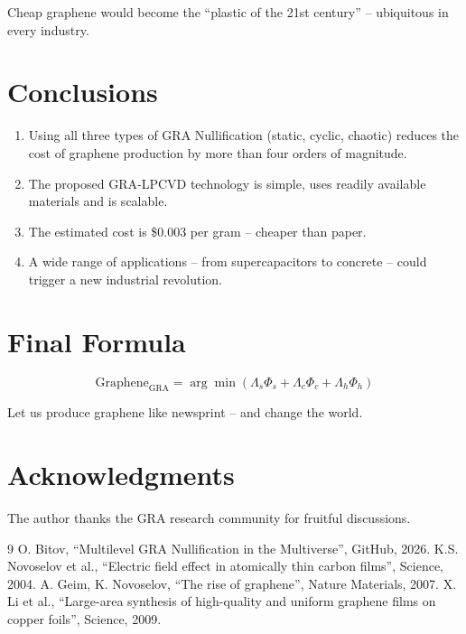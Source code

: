 \documentclass[12pt,a4paper]{article}
\begin{document}
Cheap graphene would become the “plastic of the 21st century” – ubiquitous in every industry.

\section{Conclusions}

\begin{enumerate}
    \item Using all three types of GRA Nullification (static, cyclic, chaotic) reduces the cost of graphene production by more than four orders of magnitude.
    \item The proposed GRA‑LPCVD technology is simple, uses readily available materials and is scalable.
    \item The estimated cost is \$0.003 per gram – cheaper than paper.
    \item A wide range of applications – from supercapacitors to concrete – could trigger a new industrial revolution.
\end{enumerate}

\section*{Final Formula}

\[
\boxed{\text{Graphene}_{\text{GRA}} = \arg\min \left( \Lambda_s \Phi_s + \Lambda_c \Phi_c + \Lambda_h \Phi_h \right)}
\]

Let us produce graphene like newsprint – and change the world.

\section*{Acknowledgments}

The author thanks the GRA research community for fruitful discussions.

\begin{thebibliography}{9}
 O. Bitov, “Multilevel GRA Nullification in the Multiverse”, GitHub, 2026.
 K.S. Novoselov et al., “Electric field effect in atomically thin carbon films”, Science, 2004.
 A. Geim, K. Novoselov, “The rise of graphene”, Nature Materials, 2007.
 X. Li et al., “Large-area synthesis of high-quality and uniform graphene films on copper foils”, Science, 2009.
\end{thebibliography}
\end{document}
